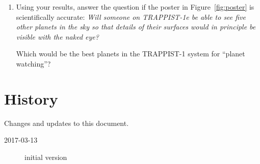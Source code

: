 \documentclass[letterpaper]{scrartcl}
\newenvironment{enuma}{\begin{enumerate}[label=(\alph*)]}{\end{enumerate}}
\newenvironment{enumi}{\begin{enumerate}[label=(\roman*)]}{\end{enumerate}}
\renewcommand{\vec}[1]{\ensuremath{\mathbf{#1}}}
\begin{document}
\begin{enuma}
  \ref{sec:nearby}).
  \begin{enumi}    
  \item Given the resolution of the naked eye, Eq.~\ref{eq:thetaeye},
    determine the maximum distance $d_{0}$ for two planets so that an
    observer could resolve large-scale landscape features of size $y
    \ge 1000\,\text{km}$.
  \item Analyze $\vec{r}_{i}(t)$ to find for each time step the number
    of planets $\nu_{i}(t)$ that are nearby to planet $i$ (excluding
    the planet itself). Plot $\nu_{i}(t)$ for $i=4$ (TRAPPIST-1e) (and
    other planets if necessary for your discussion).
  \item For each planet $i$, calculate the probability over the 1000 d
    observation time to have exactly $\nu$ other planets nearby,
    $P_{i}(\nu)$.\footnote{You may perform these calculations in any
      way that you like. You might, however, find it useful to look at
      the NumPy \texttt{numpy.histogram()} and/or Matplotlib
      \texttt{matplotlib.pyplot.hist()} functions.} 
    
    Plot the probabilities $P_{i}(\nu)$ for all six planets. 
  \end{enumi}
\item Using your results, answer the question if the poster in
  Figure~\ref{fig:poster} is scientifically accurate: \emph{Will
    someone on TRAPPIST-1e be able to see five other planets in the
    sky so that details of their surfaces would in principle be
    visible with the naked eye?}

  Which would be the best planets in the TRAPPIST-1 system for
  ``planet watching''?
\end{enuma}

\section{History}
\label{sec:history}

Changes and updates to this document.
\begin{description}
\item[2017-03-13] initial version
\end{description}

\end{document}
